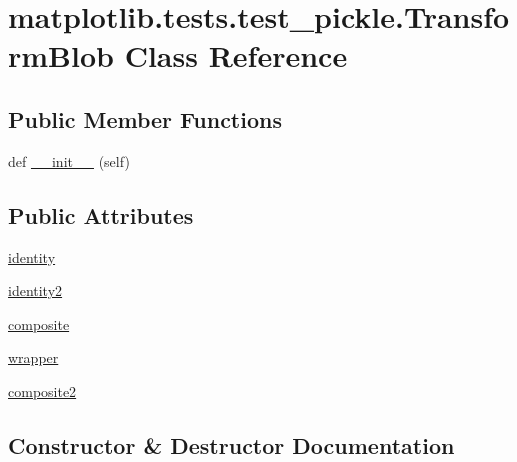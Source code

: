 \hypertarget{classmatplotlib_1_1tests_1_1test__pickle_1_1TransformBlob}{}\section{matplotlib.\+tests.\+test\+\_\+pickle.\+Transform\+Blob Class Reference}
\label{classmatplotlib_1_1tests_1_1test__pickle_1_1TransformBlob}
\subsection*{Public Member Functions}
\begin{DoxyCompactItemize}
\item 
def \hyperlink{classmatplotlib_1_1tests_1_1test__pickle_1_1TransformBlob_a52f2d63feaae0e8aa394ac18c7c52047}{\+\_\+\+\_\+init\+\_\+\+\_\+} (self)
\end{DoxyCompactItemize}
\subsection*{Public Attributes}
\begin{DoxyCompactItemize}
\item 
\hyperlink{classmatplotlib_1_1tests_1_1test__pickle_1_1TransformBlob_a7d4fd8c2c6e1aaa913aad737b887a0fd}{identity}
\item 
\hyperlink{classmatplotlib_1_1tests_1_1test__pickle_1_1TransformBlob_a36b84fab43d18ecd6aca214d2bc9206b}{identity2}
\item 
\hyperlink{classmatplotlib_1_1tests_1_1test__pickle_1_1TransformBlob_af86fdeb73394e8292b21f249eda18055}{composite}
\item 
\hyperlink{classmatplotlib_1_1tests_1_1test__pickle_1_1TransformBlob_a5a0aa352085a640f0f7b23b2250e5c43}{wrapper}
\item 
\hyperlink{classmatplotlib_1_1tests_1_1test__pickle_1_1TransformBlob_a301063b375b55b523d9485ac6d8c9650}{composite2}
\end{DoxyCompactItemize}


\subsection{Constructor \& Destructor Documentation}
\mbox{\label{classmatplotlib_1_1tests_1_1test__pickle_1_1TransformBlob_a52f2d63feaae0e8aa394ac18c7c52047}} 
